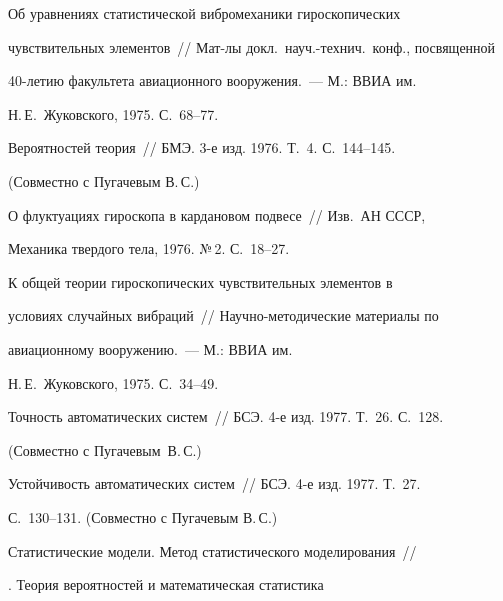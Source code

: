  Об уравнениях статистической вибромеханики гироскопических


чувствительных элементов~// Мат-лы докл.\ науч.-технич.\ конф., посвященной


40-летию факультета авиационного вооружения.~--- М.: ВВИА им.\


Н.\,Е.~Жуковского, 1975. С.~68--77.










 Вероятностей теория~// БМЭ. 3-е изд. 1976. Т.~4. С.~144--145.


(Совместно с Пугачевым В.\,С.)





 О флуктуациях гироскопа в кардановом подвесе~// Изв.\ АН СССР,


Механика твердого тела, 1976. №\,2. С.~18--27.





 К общей теории гироскопических чувствительных элементов в


условиях случайных вибраций~// Научно-методические материалы по


авиационному вооружению.~--- М.: ВВИА им.\


Н.\,Е.~Жуковского, 1975. С.~34--49.










 Точность автоматических систем~// БСЭ. 4-е изд. 1977. Т.~26. С.~128.


(Совместно с Пугачевым~В.\,С.)





 Устойчивость автоматических систем~// БСЭ. 4-е изд. 1977. Т.~27.


С.~130--131. (Совместно с Пугачевым В.\,С.)










Статистические модели. Метод статистического моделирования~//


. Теория вероятностей и математическая статистика


